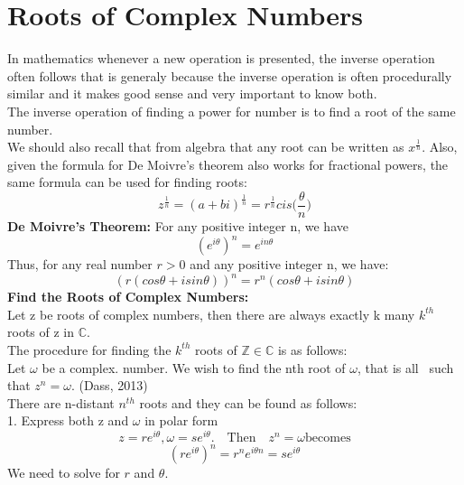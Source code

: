 \documentclass[a4paper, 12pt]{report}
\begin{document}
{\section{Roots of Complex Numbers}
In mathematics whenever a new operation is presented, the inverse operation often follows that is generaly because the inverse operation is often procedurally similar and it makes good sense and very important to know both.\\
The inverse operation of finding a power for number is to find a root of the same number.\\
We should also recall that from algebra that any root can be written as $x^{\frac{1}{n}}$. Also, given the formula for De Moivre's theorem also works for fractional powers, the same formula can be used for finding roots:
\begin{equation*}
z^{\frac{1}{n}} = (a + bi)^{\frac{1}{n}} = r^{\frac{1}{n}}cis\bigg(\frac{\theta}{n}\bigg)
\end{equation*}
\textbf{De Moivre's Theorem:}
For any positive integer n, we have
\begin{equation*}
(e^{i\theta})^n = e^{in\theta}
\end{equation*}
Thus, for any real number $r > 0$ and any positive integer n, we have:
\begin{equation*}
(r(cos\theta + isin\theta))^n = r^n(cos\theta + isin\theta)
\end{equation*}
\textbf{Find the Roots of Complex Numbers:}\\
Let z be roots of complex numbers, then there are always exactly k many $k^{th}$ roots of z in $\mathbb{C}$.\\
The procedure for finding the $k^{th}$ roots of $\mathbb{Z} \in \mathbb{C}$ is as follows:\\
Let $\omega$ be a complex. number. We wish to find the nth root of $\omega$, that is all \ such that $z^n = \omega$. (Dass, 2013)\\
There are n-distant $n^{th}$ roots and they can be found as follows:\\
1. Express both z and $\omega$ in polar form
\begin{equation*}
z = re^{i\theta}, \omega = se^{i\theta}. \quad \text{Then} \quad z^n = \omega \text{becomes}
\end{equation*}
\begin{equation*}
(re^{i\theta})^n = r^ne^{i\theta n} = se^{i\theta}
\end{equation*}
We need to solve for $r$ and $\theta$.\\
}
\end{document}
